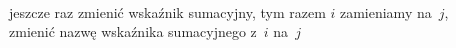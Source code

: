 \documentclass[a4paper,11pt]{article}
\begin{document}
\begin{center}
\end{center}

\vspace{\spaceTwo}


 \\
\Jest  jeszcze raz zmienić wskaźnik sumacyjny, tym razem $i$ zamieniamy
na~$j$, \\
\Powin zmienić nazwę wskaźnika sumacyjnego z~$i$ na~$j$ \\













{}






\end{document}
